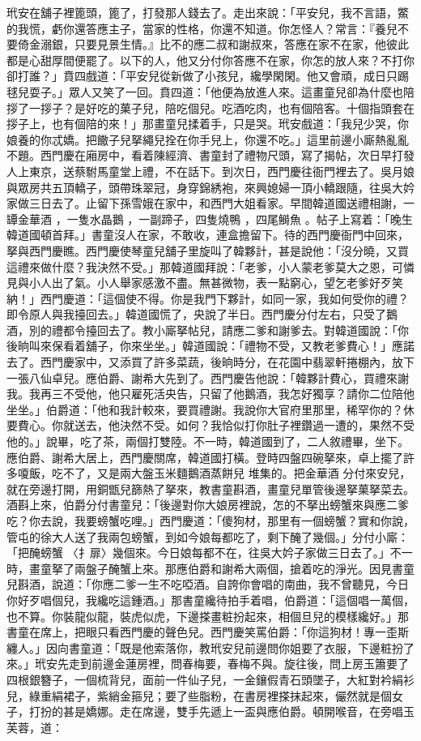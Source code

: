\begin{showcontents}{}
玳安在舖子裡篦頭，篦了，打發那人錢去了。走出來說：「平安兒，我不言語，鱉的我慌，虧你還答應主子，當家的性格，你還不知道。你怎怪人？常言：『養兒不要倚金溺銀，只要見景生情。』比不的應二叔和謝叔來，答應在家不在家，他彼此都是心甜厚間便罷了。以下的人，他又分付你答應不在家，你怎的放人來？不打你卻打誰？」賁四戲道：「平安兒從新做了小孩兒，纔學閑閑。他又會頑，成日只踢毬兒耍子。」眾人又笑了一回。賁四道：「他便為放進人來。這畫童兒卻為什麼也陪拶了一拶子？是好吃的菓子兒，陪吃個兒。吃酒吃肉，也有個陪客。十個指頭套在拶子上，也有個陪的來！」那畫童兒揉着手，只是哭。玳安戲道：「我兒少哭，你娘養的你忒嬌。把饊子兒拏繩兒拴在你手兒上，你還不吃。」這里前邊小廝熱亂亂不題。西門慶在廂房中，看着陳經濟、書童封了禮物尺頭，寫了揭帖，次日早打發人上東京，送蔡駙馬童堂上禮，不在話下。到次日，西門慶往衙門裡去了。吳月娘與眾房共五頂轎子，頭帶珠翠冠，身穿錦綉袍，來興媳婦一頂小轎跟隨，往吳大妗家做三日去了。止留下孫雪娥在家中，和西門大姐看家。早間韓道國送禮相謝，一罈金華酒 ，一隻水晶鵝 ，一副蹄子，四隻燒鴨 ，四尾鰣魚 。帖子上寫着：「晚生韓道國頓首拜。」書童沒人在家，不敢收，連盒擔留下。待的西門慶衙門中回來，拏與西門慶瞧。西門慶使琴童兒舖子里旋叫了韓夥計，甚是說他：「沒分曉，又買這禮來做什麼？我決然不受。」那韓道國拜說：「老爹，小人蒙老爹莫大之恩，可憐見與小人出了氣。小人舉家感激不盡。無甚微物，表一點窮心，望乞老爹好歹笑納！」西門慶道：「這個使不得。你是我門下夥計，如同一家，我如何受你的禮？即令原人與我擡回去。」韓道國慌了，央說了半日。西門慶分付左右，只受了鵝酒，別的禮都令擡回去了。教小廝拏帖兒，請應二爹和謝爹去。對韓道國說：「你後晌叫來保看着舖子，你來坐坐。」韓道國說：「禮物不受，又教老爹費心！」應諾去了。西門慶家中，又添買了許多菜蔬，後晌時分，在花園中翡翠軒捲棚內，放下一張八仙卓兒。應伯爵、謝希大先到了。西門慶告他說：「韓夥計費心，買禮來謝我。我再三不受他，他只雇死活央告，只留了他鵝酒，我怎好獨享？請你二位陪他坐坐。」伯爵道：「他和我計較來，要買禮謝。我說你大官府里那里，稀罕你的？休要費心。你就送去，他決然不受。如何？我恰似打你肚子裡鑽過一遭的，果然不受他的。」說畢，吃了茶，兩個打雙陸。不一時，韓道國到了，二人敘禮畢，坐下。應伯爵、謝希大居上，西門慶關席，韓道國打橫。登時四盤四碗拏來，卓上擺了許多嗄飯，吃不了，又是兩大盤玉米麵鵝酒蒸餅兒 堆集的。把金華酒 分付來安兒，就在旁邊打開，用銅甑兒篩熱了拏來，教書童斟酒，畫童兒單管後邊拏菓拏菜去。酒斟上來，伯爵分付書童兒：「後邊對你大娘房裡說，怎的不拏出螃蟹來與應二爹吃？你去說，我要螃蟹吃哩。」西門慶道：「傻狗材，那里有一個螃蟹？實和你說，管屯的徐大人送了我兩包螃蟹，到如今娘每都吃了，剩下醃了幾個。」分付小廝：「把醃螃蟹 〈扌扉〉幾個來。今日娘每都不在，往吳大妗子家做三日去了。」不一時，畫童拏了兩盤子醃蟹上來。那應伯爵和謝希大兩個，搶着吃的淨光。因見書童兒斟酒，說道：「你應二爹一生不吃啞酒。自誇你會唱的南曲，我不曾聽見，今日你好歹唱個兒，我纔吃這鍾酒。」那書童纔待拍手着唱，伯爵道：「這個唱一萬個，也不算。你裝龍似龍，裝虎似虎，下邊搽畫粧扮起來，相個旦兒的模樣纔好。」那書童在席上，把眼只看西門慶的聲色兒。西門慶笑罵伯爵：「你這狗材！專一歪斯纏人。」因向書童道：「既是他索落你，教玳安兒前邊問你姐要了衣服，下邊粧扮了來。」玳安先走到前邊金蓮房裡，問春梅要，春梅不與。旋往後，問上房玉簫要了四根銀簪子，一個梳背兒，面前一件仙子兒，一金鑲假青石頭墜子，大紅對衿絹衫兒，綠重絹裙子，紫綃金箍兒；要了些脂粉，在書房裡搽抹起來，儼然就是個女子，打扮的甚是嬌娜。走在席邊，雙手先遞上一盃與應伯爵。頓開喉音，在旁唱玉芙蓉，道：


\end{showcontents}
